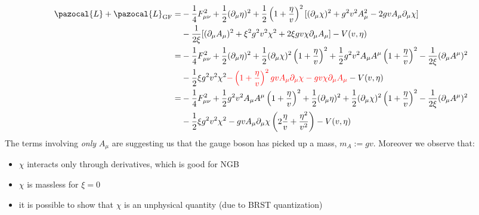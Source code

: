 \documentclass[../main.tex]{subfiles}
\begin{document}
\begin{align*}
\pazocal{L}+\pazocal{L}_{\text{GF}}=&-\frac{1}{4}F_{\mu\nu}^2+\frac{1}{2}(\partial_\mu\eta)^2+\frac{1}{2}\left(1+\frac{\eta}{v}\right)^2[(\partial_\mu\chi)^2+g^2v^2A_\mu^2-2gvA_\mu\partial_\mu\chi]\\
&-\frac{1}{2\xi}[(\partial_\mu A_\mu)^2+\xi^2g^2v^2\chi^2+2\xi gv\chi\partial_\mu A_\mu]-V(v,\eta)\\
=&-\frac{1}{4}F_{\mu\nu}^2+\frac{1}{2}(\partial_\mu\eta)^2+\frac{1}{2}(\partial_\mu\chi)^2\left(1+\frac{\eta}{v}\right)^2+\frac{1}{2}g^2v^2A_\mu A^\mu\left(1+\frac{\eta}{v}\right)^2-\frac{1}{2\xi}(\partial_\mu A^\mu)^2\\
&-\frac{1}{2}\xi g^2v^2\chi^2{\color{red}-\left(1+\frac{\eta}{v}\right)^2gvA_\mu\partial_\mu\chi-gv\chi\partial_\mu A_\mu}-V(v,\eta)\\
=&-\frac{1}{4}F_{\mu\nu}^2+\frac{1}{2}g^2v^2A_\mu A^\mu\left(1+\frac{\eta}{v}\right)^2+\frac{1}{2}(\partial_\mu\eta)^2+\frac{1}{2}(\partial_\mu\chi)^2\left(1+\frac{\eta}{v}\right)^2-\frac{1}{2\xi}(\partial_\mu A^\mu)^2\\
&-\frac{1}{2}\xi g^2v^2\chi^2-gvA_\mu\partial_\mu\chi\left(2\frac{\eta}{v}+\frac{\eta^2}{v^2}\right)-V(v,\eta)
\end{align*}
The terms involving \textit{only} $A_\mu$ are suggesting us that the gauge boson has picked up a mass, $m_A:=gv$. Moreover we observe that:
\begin{itemize}
    \item $\chi$ interacts only through derivatives, which is good for NGB 
    \item $\chi$ is massless for $\xi=0$
    \item it is possible to show that $\chi$ is an unphysical quantity (due to BRST quantization)
\end{itemize}
\end{document}
